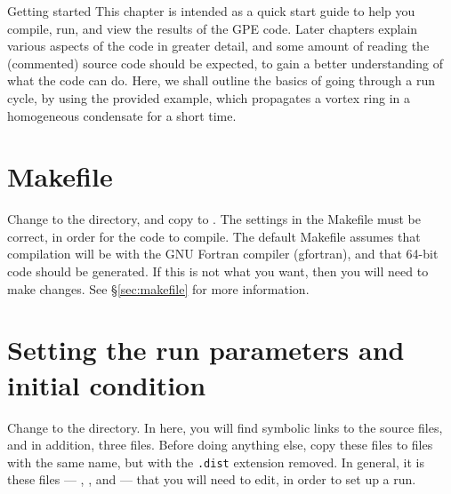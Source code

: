 %
%
%

\begin{chapter}{\label{cha:quickstart}Getting started}
  This chapter is intended as a quick start guide to help you compile, run, and
  view the results of the GPE code.  Later chapters explain various aspects of
  the code in greater detail, and some amount of reading the (commented) source
  code should be expected, to gain a better understanding of what the code can
  do.  Here, we shall outline the basics of going through a run cycle, by using
  the provided  example, which propagates a vortex ring in a
  homogeneous condensate for a short time.

  \section{Makefile}
  Change to the  directory, and copy  to
  .  The settings in the Makefile must be correct, in order
  for the code to compile.  The default Makefile assumes that compilation will
  be with the GNU Fortran compiler (gfortran), and that 64-bit code should be
  generated.  If this is not what you want, then you will need to make changes.
  See \S\ref{sec:makefile} for more information.

  \section{Setting the run parameters and initial condition}
  Change to the  directory.  In here, you will find
  symbolic links to the source files, and in addition, three 
  files.  Before doing anything else, copy these files to files with the same
  name, but with the \verb".dist" extension removed.  In general, it is these
  files --- , , and  ---
  that you will need to edit, in order to set up a run.


\end{chapter}
